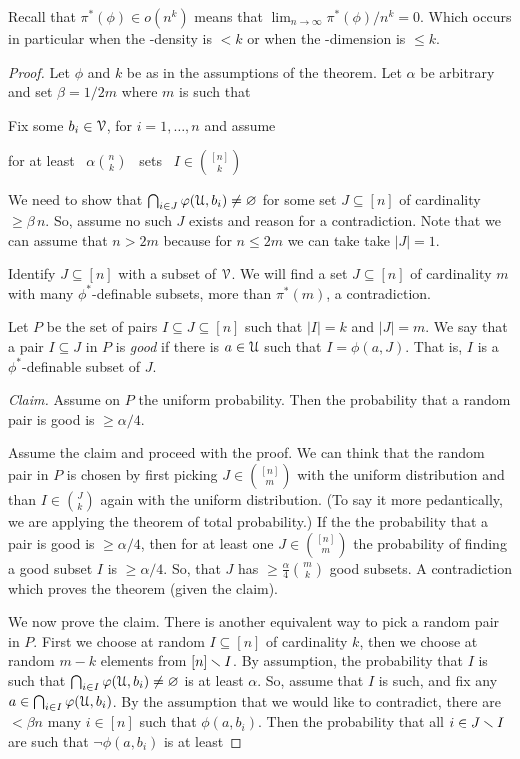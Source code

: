 \documentclass[scombinatorics.tex]{subfiles}
\begin{document}
Recall that $\pi^*(\phi)\in o(n^k)$ means that $\lim_{n\to\infty}\pi^*(\phi)/n^k=0$.
Which occurs in particular when the \vc-density is $<k$ or when the \vc-dimension is $\le k$.
\begin{proof}
Let $\phi$ and $k$ be as in the assumptions of the theorem.
Let $\alpha$ be arbitrary and set $\beta=1/2m$ where $m$ is such that 


Fix some  $b_i\in\EuScript V$, for $i=1,\dots,n$ and assume
 
\quad for at least \ $\displaystyle\alpha{n\choose k}$ \ sets \ $\displaystyle I\in{[n]\choose k}$

We need to show that $\bigcap_{i\in J}\varphi(\EuScript U,b_i)\neq\varnothing$ for some  set $J\subseteq [n]$ of cardinality $\ge\beta\,n$.
So, assume no such $J$ exists and reason for a contradiction.
Note that we can assume that $n>2m$ because for $n\le2m$ we can take take $|J|=1$.

Identify $J\subseteq[n]$ with a subset of $\EuScript V$.
We will find a set $J\subseteq[n]$ of cardinality $m$ with many $\phi^*$-definable subsets, more than $\pi^*(m)$, a contradiction.

Let $P$ be the set of pairs $I\subseteq J\subseteq[n]$ such that $|I|=k$ and $|J|=m$.
We say that a pair $I\subseteq J$ in $P$ is \textit{good\/} if there is $a\in\EuScript U$ such that $I=\phi(a,J)$.
That is, $I$ is a $\phi^*$-definable subset of $J$.

\textit{Claim.} Assume on $P$ the uniform probability.
Then the probability that a random pair is good is $\ge\alpha/4$.

Assume the claim and proceed with the proof.
We can think that the random pair in $P$ is chosen by first picking $J\in{[n]\choose m}$ with the uniform distribution and than $I\in{J\choose k}$ again with the uniform distribution. 
(To say it more pedantically, we are applying the theorem of total probability.)
If the the probability that a pair is good is $\ge\alpha/4$, then for at least one $J\in{[n]\choose m}$ the probability of finding a good subset $I$ is $\ge\alpha/4$.
So, that $J$ has $\ge\frac\alpha4{m\choose k}$ good subsets.
A contradiction which proves the theorem (given the claim).

We now prove the claim.
There is another equivalent way to pick a random pair in $P$.
First we choose at random $I\subseteq[n]$ of cardinality $k$, then we choose at random $m-k$ elements from $[n]\smallsetminus I$.
By assumption, the probability that $I$ is such that $\bigcap_{i\in I}\varphi(\EuScript U,b_i)\neq\varnothing$ is at least $\alpha$.
So, assume that $I$ is such, and fix any $a\in \bigcap_{i\in I}\varphi(\EuScript U,b_i)$.
By the assumption that we would like to contradict, there are $<\beta n$ many $i\in[n]$ such that $\phi(a,b_i)$.
Then the probability that all $i\in J\smallsetminus I$ are such that $\neg\phi(a,b_i)$ is at least


\end{proof}
\end{document}
